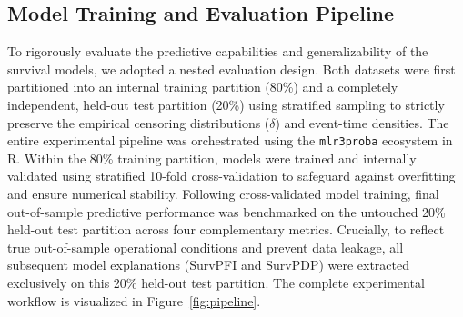 \documentclass[pdflatex,sn-mathphys-ay]{sn-jnl}%
\theoremstyle{thmstyleone}%
\theoremstyle{thmstyletwo}%
\theoremstyle{thmstylethree}%
\begin{document}
\subsection{Model Training and Evaluation Pipeline}
\label{sec:experiments}

To rigorously evaluate the predictive capabilities and generalizability of the survival models, we adopted a nested evaluation design. Both datasets were first partitioned into an internal training partition (80\%) and a completely independent, held-out test partition (20\%) using stratified sampling to strictly preserve the empirical censoring distributions ($\delta$) and event-time densities. The entire experimental pipeline was orchestrated using the \texttt{mlr3proba} ecosystem in R. Within the 80\% training partition, models were trained and internally validated using stratified 10-fold cross-validation to safeguard against overfitting and ensure numerical stability. Following cross-validated model training, final out-of-sample predictive performance was benchmarked on the untouched 20\% held-out test partition across four complementary metrics. Crucially, to reflect true out-of-sample operational conditions and prevent data leakage, all subsequent model explanations (SurvPFI and SurvPDP) were extracted exclusively on this 20\% held-out test partition. The complete experimental workflow is visualized in Figure~\ref{fig:pipeline}.

\end{document}
